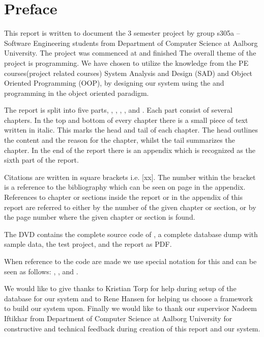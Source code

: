 \chapter*{Preface}
\label{chap:preface}
%
\emptyTop{}%
\vspace{-15mm}%
This report is written to document the 3\rd{} semester project by group s305a -- Software Engineering students from Department of Computer Science at Aalborg University. 
The project was commenced at  and finished 
The overall theme of the project is programming. 
We have chosen to utilize the knowledge from the PE courses(project related courses) System Analysis and Design (SAD) and Object Oriented Programming (OOP), by designing our system using the \ooad and programming \hdesk[] in the object oriented paradigm.  

The report is split into five parts, , , , , and . Each part consist of several chapters. In the top and bottom of every chapter there is a small piece of text written in italic. This marks the head and tail of each chapter. The head outlines the content and the reason for the chapter, whilst the tail summarizes the chapter.
In the end of the report there is an appendix which is recognized as the sixth part of the report.

Citations are written in square brackets i.e. [xx]. The number within the bracket is a reference to the bibliography which can be seen on page \pageref{chap:bib} in the appendix.
References to chapter or sections inside the report or in the appendix of this report are referred to either by the number of the given chapter or section, or by the page number where the given chapter or section is found.

The DVD contains the complete source code of \hdesk[], a complete database dump with sample data, the test project, and the report as PDF.  

When reference to the code are made we use special notation for this and can be seen as follows: , ,  and .

We would like to give thanks to Kristian Torp for help during setup of the database for our system and to Rene Hansen for helping us choose a framework to build our system upon.
Finally we would like to thank our supervisor Nadeem Iftikhar from Department of Computer Science at Aalborg University for constructive and technical feedback during creation of this report and our system.